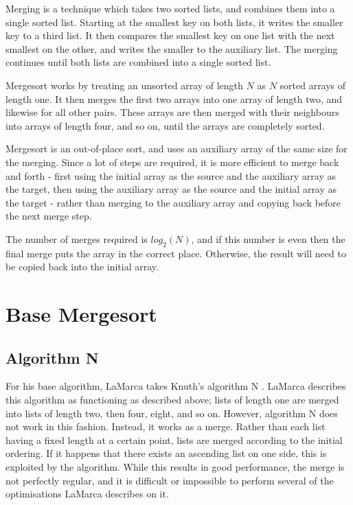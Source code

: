 \label{Mergesort}
Merging is a technique which takes two sorted lists, and combines them into a
single sorted list. Starting at the smallest key on both lists, it writes the
smaller key to a third list. It then compares the smallest key on one list with
the next smallest on the other, and writes the smaller to the auxiliary list.
The merging continues until both lists are combined into a single sorted list.

Mergesort works by treating an unsorted array of length $N$ as $N$ sorted arrays of
length one. It then merges the first two arrays into one array of length two, and
likewise for all other pairs. These arrays are then merged with their neighbours
into arrays of length four, and so on, until the arrays are completely sorted.

Mergesort is an out-of-place sort, and uses an auxiliary array of the same size
for the merging. Since a lot of steps are required, it is more efficient to
merge back and forth - first using the initial array as the source and the
auxiliary array as the target, then using the auxiliary array as the source and
the initial array as the target - rather than merging to the auxiliary array and
copying back before the next merge step.

The number of merges required is $log_2(N)$, and if this number is even then
the final merge puts the array in the correct place. Otherwise, the result will
need to be copied back into the initial array.

\section{Base Mergesort}

\subsection{Algorithm N}
\label{Algorithm N}

For his base algorithm, LaMarca takes Knuth's algorithm N \cite{Knuth98}.
LaMarca describes this algorithm as functioning as described above; lists of
length one are merged into lists of length two, then four, eight, and so on.
However, algorithm N does not work in this fashion. Instead, it works as a
 merge. Rather than each list having a fixed length at a certain
point, lists are merged according to the initial ordering. If it happens that
there exists an ascending list on one side, this is exploited by the algorithm.
While this results in good performance, the merge is not perfectly regular, and
it is difficult or impossible to perform several of the optimisations LaMarca
describes on it.

